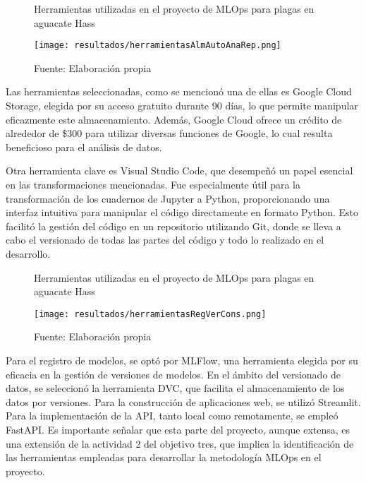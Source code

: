 \begin{figure}[h]
\centering
\caption{Herramientas utilizadas en el proyecto de MLOps para plagas en aguacate Hass}
\texttt{[image: resultados/herramientasAlmAutoAnaRep.png]}
\caption*{\footnotesize Fuente: Elaboración propia}
\label{fig:figuraHerramientasAlmAutoAnaRep}
\end{figure}

\newpage

Las herramientas seleccionadas, como se mencionó una de ellas es Google Cloud Storage, elegida por su acceso gratuito durante 90 días, lo que permite manipular eficazmente este almacenamiento. Además, Google Cloud ofrece un crédito de alrededor de \$300 para utilizar diversas funciones de Google, lo cual resulta beneficioso para el análisis de datos. \newline

Otra herramienta clave es Visual Studio Code, que desempeñó un papel esencial en las transformaciones mencionadas. Fue especialmente útil para la transformación de los cuadernos de Jupyter a Python, proporcionando una interfaz intuitiva para manipular el código directamente en formato Python. Esto facilitó la gestión del código en un repositorio utilizando Git, donde se lleva a cabo el versionado de todas las partes del código y todo lo realizado en el desarrollo.

\newpage

\begin{figure}[h]
\centering
\caption{Herramientas utilizadas en el proyecto de MLOps para plagas en aguacate Hass}
\texttt{[image: resultados/herramientasRegVerCons.png]}
\caption*{\footnotesize Fuente: Elaboración propia}
\label{fig:figuraHerramientasRegVerCons}
\end{figure}

Para el registro de modelos, se optó por MLFlow, una herramienta elegida por su eficacia en la gestión de versiones de modelos. En el ámbito del versionado de datos, se seleccionó la herramienta DVC, que facilita el almacenamiento de los datos por versiones. Para la construcción de aplicaciones web, se utilizó Streamlit. Para la implementación de la API, tanto local como remotamente, se empleó FastAPI. Es importante señalar que esta parte del proyecto, aunque extensa, es una extensión de la actividad 2 del objetivo tres, que implica la identificación de las herramientas empleadas para desarrollar la metodología MLOps en el proyecto.

\newpage

